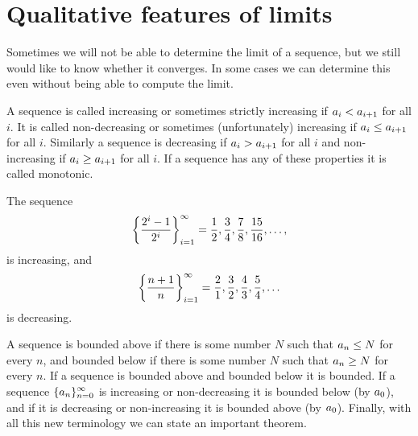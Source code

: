 
\section{Qualitative features of limits}

Sometimes we will not be able to determine the limit of a sequence,
but we still would like to know whether it converges. In some cases we
can determine this even without being able to compute the limit.

A sequence is called {\dfont increasing\/}
or sometimes {\dfont strictly increasing\/} if $\displaystyle a_i<a_{i+1}$ for all
$i$. It is called {\dfont
non-decreasing\/} or sometimes
(unfortunately) {\dfont increasing\/} if $\displaystyle a_i\le a_{i+1}$ for all
$i$. Similarly a sequence is {\dfont
decreasing\/} if $\displaystyle a_i>a_{i+1}$ for all $i$
and {\dfont non-increasing\/} if
$\displaystyle a_i\ge a_{i+1}$ for all $i$. If a sequence has any of these
properties it is called {\dfont monotonic\/}.

\begin{example}
The sequence
$$
  \left\{{2^i-1\over2^i}\right\}_{i=1}^\infty=
  {1\over2},{3\over4},{7\over8},{15\over16},\ldots,
$$
is increasing, and
$$ 
  \left\{{n+1\over n}\right\}_{i=1}^\infty=
  {2\over1},{3\over2},{4\over3},{5\over4},\ldots
$$
is decreasing.
\end{example}

A sequence is {\dfont bounded above\/}
if there is some number $N$ such that $\displaystyle a_n\le N$ for every $n$,
and {\dfont bounded below\/} if there is
some number $N$ such that $\displaystyle a_n\ge N$ for every $n$. If a sequence
is bounded above and bounded below it is {\dfont
bounded\/}. If a sequence $\displaystyle
\{a_n\}_{n=0}^\infty$ is increasing or non-decreasing it is bounded
below (by $\displaystyle a_0$), and if it is decreasing or non-increasing it is
bounded above (by $\displaystyle a_0$).  Finally, with all this new terminology
we can state an important theorem.

